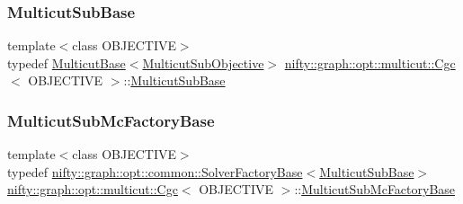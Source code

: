 \subsubsection{\texorpdfstring{Multicut\+Sub\+Base}{MulticutSubBase}}
{\footnotesize\ttfamily template$<$class O\+B\+J\+E\+C\+T\+I\+VE$>$ \\
typedef \hyperlink{classnifty_1_1graph_1_1opt_1_1multicut_1_1MulticutBase}{Multicut\+Base}$<$\hyperlink{classnifty_1_1graph_1_1opt_1_1multicut_1_1Cgc_a19a2390f261fe4c0cdcbff8049e4519b}{Multicut\+Sub\+Objective}$>$ \hyperlink{classnifty_1_1graph_1_1opt_1_1multicut_1_1Cgc}{nifty\+::graph\+::opt\+::multicut\+::\+Cgc}$<$ O\+B\+J\+E\+C\+T\+I\+VE $>$\+::\hyperlink{classnifty_1_1graph_1_1opt_1_1multicut_1_1Cgc_a9b537dda6c66a9b60656dddd1a9ade4d}{Multicut\+Sub\+Base}}

\mbox{\label{classnifty_1_1graph_1_1opt_1_1multicut_1_1Cgc_ac0d77f789b221087aac1d2bb4f1cd2da}} 
\subsubsection{\texorpdfstring{Multicut\+Sub\+Mc\+Factory\+Base}{MulticutSubMcFactoryBase}}
{\footnotesize\ttfamily template$<$class O\+B\+J\+E\+C\+T\+I\+VE$>$ \\
typedef \hyperlink{classnifty_1_1graph_1_1opt_1_1common_1_1SolverFactoryBase}{nifty\+::graph\+::opt\+::common\+::\+Solver\+Factory\+Base}$<$\hyperlink{classnifty_1_1graph_1_1opt_1_1multicut_1_1Cgc_a9b537dda6c66a9b60656dddd1a9ade4d}{Multicut\+Sub\+Base}$>$ \hyperlink{classnifty_1_1graph_1_1opt_1_1multicut_1_1Cgc}{nifty\+::graph\+::opt\+::multicut\+::\+Cgc}$<$ O\+B\+J\+E\+C\+T\+I\+VE $>$\+::\hyperlink{classnifty_1_1graph_1_1opt_1_1multicut_1_1Cgc_ac0d77f789b221087aac1d2bb4f1cd2da}{Multicut\+Sub\+Mc\+Factory\+Base}}

\mbox{\label{classnifty_1_1graph_1_1opt_1_1multicut_1_1Cgc_a949c61ec3b2f609aa78abc2e7eef05e2}} 
